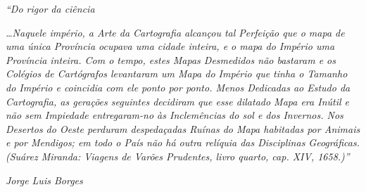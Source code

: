 \begin{epigrafe}
    \vspace*{\fill}
	\begin{flushright}
		\textit{``Do rigor da ciência}	
		
		
		\textit{…Naquele império, a Arte da Cartografia alcançou tal Perfeição que o mapa de uma única Província ocupava uma cidade inteira, e o mapa do Império uma Província inteira. Com o tempo, estes Mapas Desmedidos não bastaram e os Colégios de Cartógrafos levantaram um Mapa do Império que tinha o Tamanho do Império e coincidia com ele ponto por ponto. Menos Dedicadas ao Estudo da Cartografia, as gerações seguintes decidiram que esse dilatado Mapa era Inútil e não sem Impiedade entregaram-no às Inclemências do sol e dos Invernos. Nos Desertos do Oeste perduram despedaçadas Ruínas do Mapa habitadas por Animais e por Mendigos; em todo o País não há outra relíquia das Disciplinas Geográficas. (Suárez Miranda: Viagens de Varões Prudentes, livro quarto, cap. XIV, 1658.)''}
		
		\textit{Jorge Luis Borges}
	\end{flushright}
\end{epigrafe}

